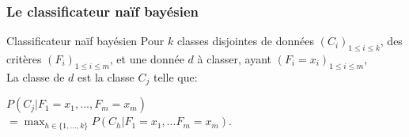 \documentclass{beamer}
\begin{document}
\begin{frame}
\frametitle{Le classificateur naïf bayésien}

\begin{block}{Classificateur naïf bayésien}
Pour $k$ classes disjointes de données $(C_{i})_{1 \le i \le k}$, des critères $(F_{i})_{1 \le i \le m}$, et une donnée $d$ à classer, ayant $(F_{i} = x_{i})_{1 \le i \le m}$,\\ La classe de $d$ est la classe $C_{j}$ telle que:\\
\begin{center}
$P(C_{j} | F_{1} = x_{1}, ..., F_{m} = x_{m})$\\
$= \max_{h \in \{ 1, ..., k \}}P(C_{h} | F_{1} = x_{1}, ... F_{m} = x_{m})$.\\
\end{center}
\end{block}


\end{frame}
\end{document}
